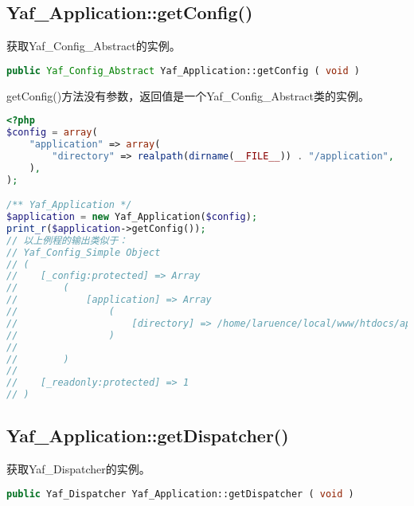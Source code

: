 \begin{lstlisting}[language=PHP]

\end{lstlisting}



\begin{lstlisting}[language=PHP]

\end{lstlisting}


\subsection{Yaf\_Application::getConfig()}

获取Yaf\_Config\_Abstract的实例。






\begin{lstlisting}[language=PHP]
public Yaf_Config_Abstract Yaf_Application::getConfig ( void )
\end{lstlisting}

getConfig()方法没有参数，返回值是一个Yaf\_Config\_Abstract类的实例。

\begin{lstlisting}[language=PHP]
<?php
$config = array(
    "application" => array(
        "directory" => realpath(dirname(__FILE__)) . "/application",
    ),
);

/** Yaf_Application */
$application = new Yaf_Application($config);
print_r($application->getConfig());
// 以上例程的输出类似于：
// Yaf_Config_Simple Object
// (
//    [_config:protected] => Array
//        (
//            [application] => Array
//                (
//                    [directory] => /home/laruence/local/www/htdocs/application
//                )
//
//        )
//
//    [_readonly:protected] => 1
// )
\end{lstlisting}






\subsection{Yaf\_Application::getDispatcher()}

获取Yaf\_Dispatcher的实例。



\begin{lstlisting}[language=PHP]
public Yaf_Dispatcher Yaf_Application::getDispatcher ( void )
\end{lstlisting}



